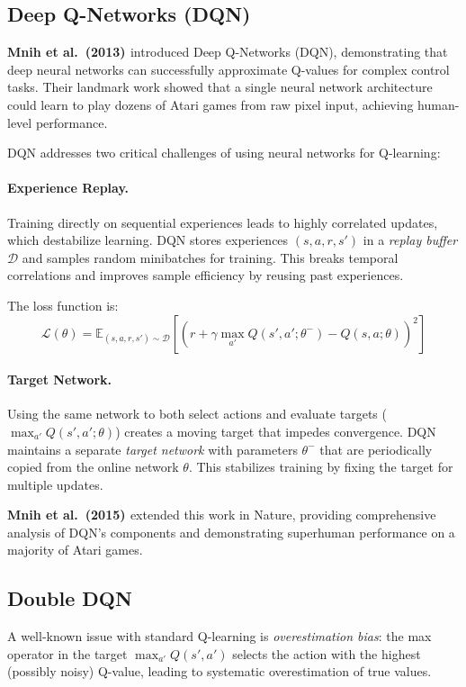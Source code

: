 \subsection{Deep Q-Networks (DQN)}

\textbf{Mnih et al.\ (2013) \cite{MKS+13}} introduced Deep Q-Networks (DQN), demonstrating that deep neural networks can successfully approximate Q-values for complex control tasks. Their landmark work showed that a single neural network architecture could learn to play dozens of Atari games from raw pixel input, achieving human-level performance.

DQN addresses two critical challenges of using neural networks for Q-learning:

\paragraph{Experience Replay.}
Training directly on sequential experiences leads to highly correlated updates, which destabilize learning. DQN stores experiences $(s, a, r, s')$ in a \textit{replay buffer} $\mathcal{D}$ and samples random minibatches for training. This breaks temporal correlations and improves sample efficiency by reusing past experiences.

The loss function is:
\[
\mathcal{L}(\theta) = \mathbb{E}_{(s,a,r,s') \sim \mathcal{D}} \left[ \left( r + \gamma \max_{a'} Q(s', a'; \theta^-) - Q(s, a; \theta) \right)^2 \right]
\]

\paragraph{Target Network.}
Using the same network to both select actions and evaluate targets ($\max_{a'} Q(s', a'; \theta)$) creates a moving target that impedes convergence. DQN maintains a separate \textit{target network} with parameters $\theta^-$ that are periodically copied from the online network $\theta$. This stabilizes training by fixing the target for multiple updates.

\textbf{Mnih et al.\ (2015) \cite{MKS+15}} extended this work in Nature, providing comprehensive analysis of DQN's components and demonstrating superhuman performance on a majority of Atari games.

\subsection{Double DQN}

A well-known issue with standard Q-learning is \textit{overestimation bias}: the max operator in the target $\max_{a'} Q(s', a')$ selects the action with the highest (possibly noisy) Q-value, leading to systematic overestimation of true values.

